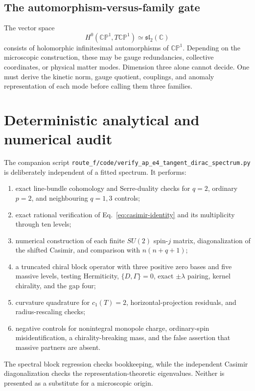 \documentclass[11pt]{article}
\theoremstyle{definition}
\theoremstyle{remark}
\newcommand{\CC}{\mathbb C}
\newcommand{\CP}{\mathbb {CP}}
\begin{document}
\subsection{The automorphism-versus-family gate}

The vector space
\begin{equation}
 H^0(\CP^1,T\CP^1)\simeq\mathfrak{sl}_2(\CC)
 \label{eq:automorphism-space}
\end{equation}
consists of holomorphic infinitesimal automorphisms of \(\CP^1\).  Depending
on the microscopic construction, these may be gauge redundancies, collective
coordinates, or physical matter modes.  Dimension three alone cannot decide.
One must derive the kinetic norm, gauge quotient, couplings, and anomaly
representation of each mode before calling them three families.

\section{Deterministic analytical and numerical audit}

The companion script
\texttt{route\_f/code/verify\_ap\_e4\_tangent\_dirac\_spectrum.py}
is deliberately independent of a fitted spectrum.  It performs:
\begin{enumerate}
\item exact line-bundle cohomology and Serre-duality checks for \(q=2\),
  ordinary \(p=2\), and neighbouring \(q=1,3\) controls;
\item exact rational verification of Eq.~\eqref{eq:casimir-identity} and its
  multiplicity through ten levels;
\item numerical construction of each finite \(SU(2)\) spin-\(j\) matrix,
  diagonalization of the shifted Casimir, and comparison with
  \(n(n+q+1)\);
\item a truncated chiral block operator with three positive zero bases and
  five massive levels, testing Hermiticity,
  \(\{D,\Gamma\}=0\), exact \(\pm\lambda\) pairing, kernel chirality, and
  the gap four;
\item curvature quadrature for \(c_1(T)=2\), horizontal-projection residuals,
  and radius-rescaling checks;
\item negative controls for nonintegral monopole charge, ordinary-spin
  misidentification, a chirality-breaking mass, and the false assertion that
  massive partners are absent.
\end{enumerate}
The spectral block regression checks bookkeeping, while the independent
Casimir diagonalization checks the representation-theoretic eigenvalues.
Neither is presented as a substitute for a microscopic origin.
\end{document}
